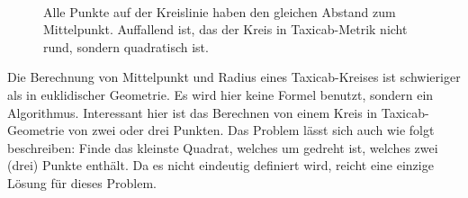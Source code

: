 \documentclass{article}
\begin{document}
\begin{figure}[!ht]
  \centering
  \qquad
  \\
  \caption{Alle Punkte auf der Kreislinie haben den gleichen Abstand zum Mittelpunkt.
  Auffallend ist, das der Kreis in Taxicab-Metrik nicht rund, sondern quadratisch ist.}
  \label{img:circle_in_diff_metrics}
\end{figure}

Die Berechnung von Mittelpunkt und Radius eines Taxicab-Kreises ist schwieriger als in euklidischer 
Geometrie. Es wird hier keine Formel benutzt, sondern ein Algorithmus. Interessant hier ist das Berechnen
von einem Kreis in Taxicab-Geometrie von zwei oder drei Punkten. Das Problem lässt sich auch wie folgt
beschreiben: Finde das kleinste Quadrat, welches um \unit[45]{\textdegree} gedreht ist, welches zwei (drei) Punkte 
enthält. Da es nicht eindeutig definiert wird, reicht eine einzige Lösung für dieses Problem.
\end{document}
